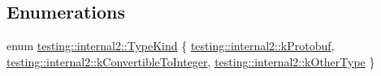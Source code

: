 \subsection*{Enumerations}
\begin{DoxyCompactItemize}
\item 
enum \mbox{\hyperlink{namespacetesting_1_1internal2_aeb8161b0b3ee503347b0662d7028fd57}{testing\+::internal2\+::\+Type\+Kind}} \{ \mbox{\hyperlink{namespacetesting_1_1internal2_aeb8161b0b3ee503347b0662d7028fd57a14aaf98a2547ecf43eef0868d54b1383}{testing\+::internal2\+::k\+Protobuf}}, 
\mbox{\hyperlink{namespacetesting_1_1internal2_aeb8161b0b3ee503347b0662d7028fd57a9bdcf3f1548f498b2b7f097306ea0224}{testing\+::internal2\+::k\+Convertible\+To\+Integer}}, 
\mbox{\hyperlink{namespacetesting_1_1internal2_aeb8161b0b3ee503347b0662d7028fd57abe8aaea44751d6ebd0cdf5bd94451db1}{testing\+::internal2\+::k\+Other\+Type}}
 \}
\end{DoxyCompactItemize}
